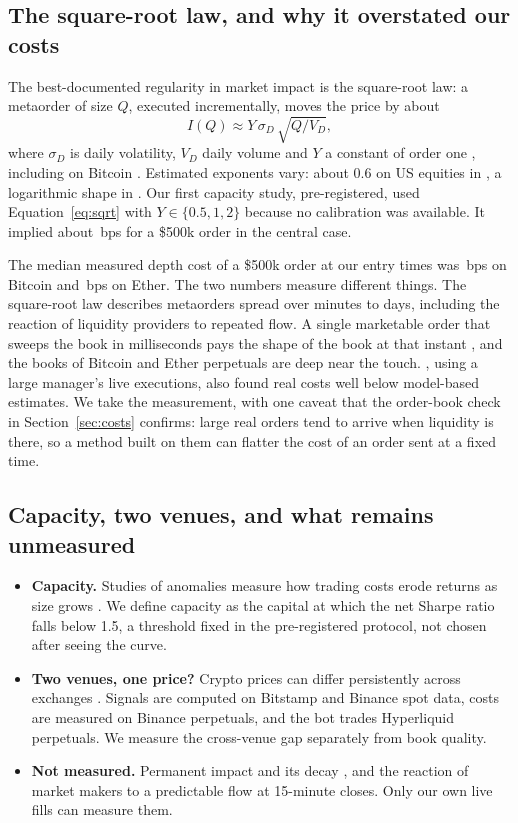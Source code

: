 \documentclass[11pt,a4paper]{article}
\newcommand{\bps}{\,bps}
\begin{document}
\subsection{The square-root law, and why it overstated our costs}
The best-documented regularity in market impact is the square-root law: a metaorder of size $Q$, executed incrementally,
moves the price by about
\begin{equation}
I(Q) \approx Y\,\sigma_D\,\sqrt{Q/V_D},
\label{eq:sqrt}
\end{equation}
where $\sigma_D$ is daily volatility, $V_D$ daily volume and $Y$ a constant of order one \citep{toth2011,bouchaud2018},
including on Bitcoin \citep{donierbonart2015}. Estimated exponents vary: about 0.6 on US equities in \citet{almgren2005}, a
logarithmic shape in \citet{zarinelli2015}. Our first capacity study, pre-registered, used Equation~\eqref{eq:sqrt} with $Y\in\{0.5,1,2\}$
because no calibration was available. It implied about \ModelImpact\bps{} for a \$500k order in the central case.

The median measured depth cost of a \$500k order at our entry times was \ImmBtc\bps{} on Bitcoin and \ImmEth\bps{} on Ether.
The two numbers measure different things. The square-root law describes metaorders spread over minutes to days,
including the reaction of liquidity providers to repeated flow. A single marketable order that sweeps the book in
milliseconds pays the shape of the book at that instant \citep{obizhaevawang2013,cont2014}, and the books of Bitcoin and Ether
perpetuals are deep near the touch. \citet{frazzini2018}, using a large manager's live executions, also found real costs well
below model-based estimates. We take the measurement, with one caveat that the order-book check in Section~\ref{sec:costs}
confirms: large real orders tend to arrive when liquidity is there, so a method built on them can flatter the cost of an order
sent at a fixed time.

\subsection{Capacity, two venues, and what remains unmeasured}
\begin{itemize}
\item \textbf{Capacity.} Studies of anomalies measure how trading costs erode returns as size grows
  \citep{novymarxvelikov2016,landier2015,frazzini2018}. We define capacity as the capital at which the net Sharpe ratio falls
  below 1.5, a threshold fixed in the pre-registered protocol, not chosen after seeing the curve.
\item \textbf{Two venues, one price?} Crypto prices can differ persistently across exchanges \citep{makarovschoar2020}. Signals
  are computed on Bitstamp and Binance spot data, costs are measured on Binance perpetuals, and the bot trades Hyperliquid
  perpetuals. We measure the cross-venue gap separately from book quality.
\item \textbf{Not measured.} Permanent impact and its decay \citep{gatheral2010,bacry2015}, and the reaction of market makers
  to a predictable flow at 15-minute closes. Only our own live fills can measure them.
\end{itemize}
\end{document}
